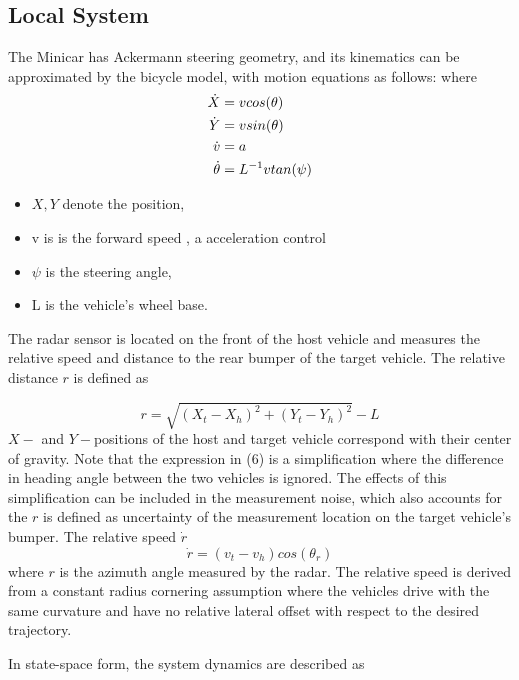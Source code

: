 \documentclass[letterpaper, 10pt, conference]{ieeeconf}  %
\begin{document}
\subsection{Local System}
The Minicar has Ackermann steering geometry, and its kinematics can be approximated by the bicycle model, with motion equations as follows:
where
\begin{align} \label{diff_1_LPV}
    \dot{X} &= v cos(\theta) \\ \notag
    \dot{Y} &= v sin(\theta)\\ \notag
    \dot{v} &= a \\ \notag
    \dot{\theta} &= L^{-1} v tan(\psi)  
\end{align}
\begin{itemize}
    \item $X , Y$ denote the position,
    \item v is is the forward speed , a acceleration control 
    \item $\psi $ is the steering angle,
    \item L is the vehicle's wheel base. 
\end{itemize}

The radar sensor is located on the front of the
 host vehicle and measures the relative speed and distance to the rear bumper of the target
 vehicle. The relative distance $r$ is defined as

\begin{equation}
    r = \sqrt{(X_t - X_h)^2 + (Y_t - Y_h)^2} - L 
\end{equation}
$X-$ and $Y-$positions of the host and target vehicle
 correspond with their center of gravity. Note that the expression in (6) is a simplification
 where the difference in heading angle between the two vehicles is ignored. The effects of
 this simplification can be included in the measurement noise, which also accounts for the
 $r$ is defined as uncertainty of the measurement location on the target vehicle's bumper. The relative speed $\dot{r}$
 \begin{equation}
     \dot{r} = (v_t - v_h) cos(\theta_r)
 \end{equation}
where $r$ is the azimuth angle measured by the radar. The relative speed is derived from a
 constant radius cornering assumption where the vehicles drive with the same curvature
 and have no relative lateral offset with respect to the desired trajectory. 



 In state-space form, the system dynamics are described as
\end{document}

